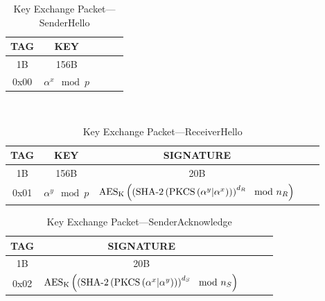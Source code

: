 \documentclass[a4paper]{article}
\begin{document}
\begin{table}[H]
    \begin{center}
        \begin{tabular}{| c | c | c | c | c |}
            \hline
            TAG & KEY \\ \hline\hline
            1B & 156B \\ \hline
            0x00 & $\alpha^x\mod{p}$ \\
            \hline
        \end{tabular}
    \end{center}
    \
    \caption{Key Exchange Packet---SenderHello}
    \label{tab:key_exchange_packet_senderhello}
\end{table}
\begin{table}[H]
    \begin{center}
        \begin{tabular}{| c | c | c | c | c |}
            \hline
            TAG & KEY & SIGNATURE \\ \hline\hline
            1B & 156B & 20B \\ \hline
            0x01 & $\alpha^y\mod{p}$ & $\text{AES}_\text{K}\left(\left(\text{SHA-2}\left(\text{PKCS}\left(\alpha^y\small|\alpha^x\right)\right)\right)^{d_R}\mod{n_R}\right)$\\
            \hline
        \end{tabular}
    \end{center}
    
    \caption{Key Exchange Packet---ReceiverHello}
    \label{tab:key_exchange_packet_receiverhello}
\end{table}
\begin{table}[H]
    \begin{center}
        \begin{tabular}{| c | c | c | c | c |}
            \hline
            TAG & SIGNATURE \\ \hline\hline
            1B & 20B \\ \hline
            0x02 & $\text{AES}_\text{K}\left(\left(\text{SHA-2}\left(\text{PKCS}\left(\alpha^x \small|\alpha^y\right)\right)\right)^{d_S}\mod{n_S}\right)$\\
            \hline
        \end{tabular}
    \end{center}

    \caption{Key Exchange Packet---SenderAcknowledge}
    \label{tab:key_exchange_packet_senderacknowledge}
\end{table}
\end{document}
